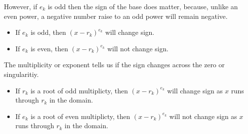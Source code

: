 \documentclass{ximera}
\begin{document}
However, if $e_k$ is odd then the sign of the base does matter, because, unlike an even power, a negative number raise to an odd power will remain negative.





\begin{itemize}
\item If $e_k$ is odd, then $(x-r_k)^{e_k}$ will change sign.
\item If $e_k$ is even, then $(x-r_k)^{e_k}$ will not change sign.
\end{itemize}


The multiplicity or exponent tells us if the sign changes across the zero or singularitiy.




\begin{itemize}
\item If $r_k$ is a root of odd multiplicty, then $(x-r_k)^{e_k}$ will change sign as $x$ runs through $r_k$ in the domain.
\item If $e_k$ is a root of even multiplicty, then $(x-r_k)^{e_k}$ will not change sign as $x$ runs through $r_k$ in the domain.
\end{itemize}
\end{document}
